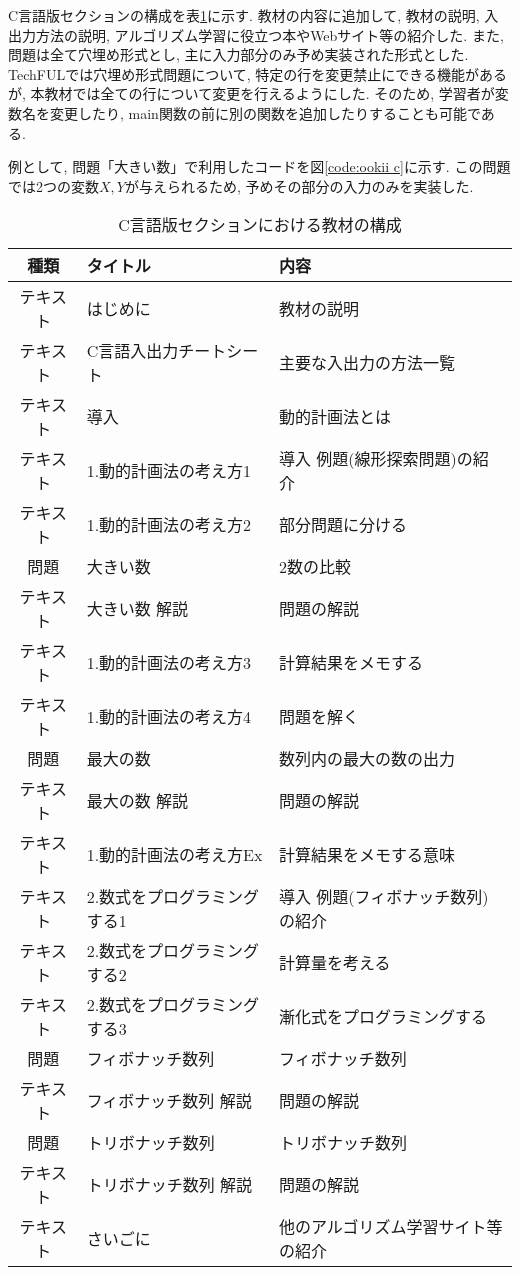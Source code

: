 C言語版セクションの構成を表\ref{tab:composition c}に示す. 
教材の内容に追加して, 教材の説明, 入出力方法の説明, アルゴリズム学習に役立つ本やWebサイト等の紹介した. 
また, 問題は全て穴埋め形式とし, 主に入力部分のみ予め実装された形式とした. 
TechFULでは穴埋め形式問題について, 特定の行を変更禁止にできる機能があるが, 本教材では全ての行について変更を行えるようにした. 
そのため, 学習者が変数名を変更したり, main関数の前に別の関数を追加したりすることも可能である. 

例として, 問題「大きい数」で利用したコードを図\ref{code:ookii c}に示す. 
この問題では2つの変数$X, Y$が与えられるため, 予めその部分の入力のみを実装した. 


\begin{table}[H]
    \caption{C言語版セクションにおける教材の構成}
    \begin{center}
    \label{tab:composition c}
    \begin{tabular}{|c|l|l|} \hline
    
    種類 & タイトル & 内容 \\ \hline
    \hline
    テキスト & はじめに & 教材の説明\\ \hline
    テキスト & C言語入出力チートシート & 主要な入出力の方法一覧 \\ \hline
    テキスト & 導入 & 動的計画法とは \\ \hline
    テキスト & 1.動的計画法の考え方1 & 導入 例題(線形探索問題)の紹介 \\ \hline
    テキスト & 1.動的計画法の考え方2 & 部分問題に分ける \\ \hline
    問題 & 大きい数 & 2数の比較 \\ \hline
    テキスト & 大きい数 解説 & 問題の解説 \\ \hline
    テキスト & 1.動的計画法の考え方3 & 計算結果をメモする \\ \hline
    テキスト & 1.動的計画法の考え方4 & 問題を解く \\ \hline
    問題 & 最大の数 & 数列内の最大の数の出力 \\ \hline
    テキスト & 最大の数 解説 & 問題の解説 \\ \hline
    テキスト & 1.動的計画法の考え方Ex & 計算結果をメモする意味 \\ \hline
    テキスト & 2.数式をプログラミングする1 & 導入 例題(フィボナッチ数列)の紹介 \\ \hline
    テキスト & 2.数式をプログラミングする2 & 計算量を考える \\ \hline
    テキスト & 2.数式をプログラミングする3 & 漸化式をプログラミングする \\ \hline
    問題 & フィボナッチ数列 & フィボナッチ数列 \\ \hline
    テキスト & フィボナッチ数列 解説 & 問題の解説 \\ \hline
    問題 & トリボナッチ数列 & トリボナッチ数列 \\ \hline
    テキスト & トリボナッチ数列 解説& 問題の解説 \\ \hline
    テキスト & さいごに & 他のアルゴリズム学習サイト等の紹介 \\ \hline
    \end{tabular}
    \end{center}
\end{table}

